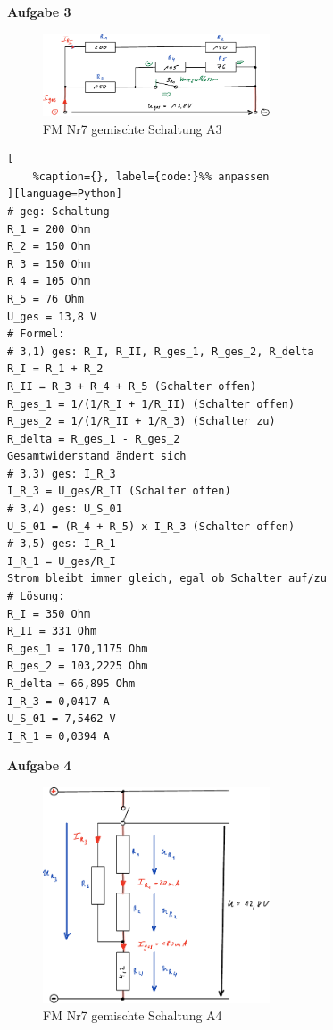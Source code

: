 \newpage

\textbf{Aufgabe 3}

\begin{figure}[!ht]%
\centering
\includegraphics[width=0.6\textwidth]{images/Skizze/25_FM_Nr7_gemischte_Schaltung_A3.pdf}
\caption{FM Nr7 gemischte Schaltung A3}
\end{figure}

\lstset{language=Python}%
\begin{lstlisting}[
	%caption={}, label={code:}%% anpassen
][language=Python]
# geg: Schaltung
R_1 = 200 Ohm
R_2 = 150 Ohm
R_3 = 150 Ohm
R_4 = 105 Ohm
R_5 = 76 Ohm
U_ges = 13,8 V
# Formel:
# 3,1) ges: R_I, R_II, R_ges_1, R_ges_2, R_delta
R_I = R_1 + R_2
R_II = R_3 + R_4 + R_5 (Schalter offen)
R_ges_1 = 1/(1/R_I + 1/R_II) (Schalter offen)
R_ges_2 = 1/(1/R_II + 1/R_3) (Schalter zu)
R_delta = R_ges_1 - R_ges_2
Gesamtwiderstand ändert sich
# 3,3) ges: I_R_3
I_R_3 = U_ges/R_II (Schalter offen)
# 3,4) ges: U_S_01
U_S_01 = (R_4 + R_5) x I_R_3 (Schalter offen)
# 3,5) ges: I_R_1
I_R_1 = U_ges/R_I
Strom bleibt immer gleich, egal ob Schalter auf/zu
# Lösung:
R_I = 350 Ohm
R_II = 331 Ohm
R_ges_1 = 170,1175 Ohm
R_ges_2 = 103,2225 Ohm
R_delta = 66,895 Ohm
I_R_3 = 0,0417 A
U_S_01 = 7,5462 V
I_R_1 = 0,0394 A
\end{lstlisting}

\newpage

\textbf{Aufgabe 4}

\begin{figure}[!ht]%
\centering
\includegraphics[width=0.6\textwidth]{images/Skizze/25_FM_Nr7_gemischte_Schaltung_A4.pdf}
\caption{FM Nr7 gemischte Schaltung A4}
\end{figure}

